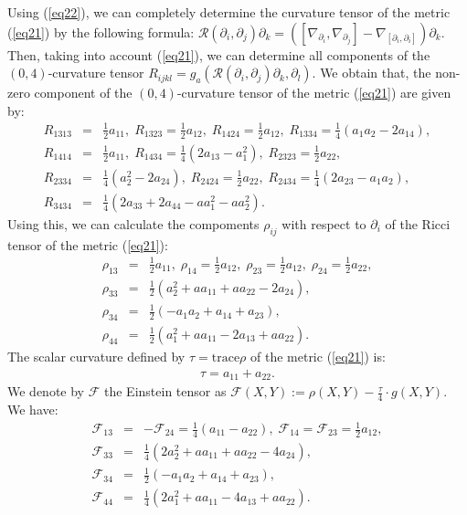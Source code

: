 \documentclass[reqno, 12pt]{amsart}
\numberwithin{equation}{section}
\begin{document}
Using (\ref{eq22}), we can completely determine the curvature tensor
of the metric (\ref{eq21}) by the following formula:
$\mathcal{R}(\partial_i, \partial_j)\partial_k = ([\nabla_{\partial_i}, 
\nabla_{\partial_j}]  - \nabla_{[\partial_i, \partial_i]}) \partial_k$. Then, 
taking into account (\ref{eq21}), we can determine all components 
of the $(0,4)$-curvature tensor 
$R_{ijkl}=g_{a}(\mathcal{R}(\partial_i,\partial_j)\partial_k, \partial_l)$. 
We obtain that, the non-zero component of the $(0,4)$-curvature tensor 
of the metric (\ref{eq21}) are given by:
\begin{eqnarray}\label{eq23}
R_{1313} &=& \frac{1}{2}a_{11}, \;
R_{1323} = \frac{1}{2}a_{12}, \;
R_{1424} = \frac{1}{2}a_{12} ,\;
R_{1334} = \frac{1}{4}(a_1a_2-2a_{14}) , \nonumber\\
R_{1414} & = & \frac{1}{2}a_{11} ,\;
R_{1434} = \frac{1}{4}(2a_{13} - a^{2}_1) ,\;
R_{2323} = \frac{1}{2}a_{22} , \nonumber\\
R_{2334} &=& \frac{1}{4}(a^{2}_2-2a_{24}) , \;
R_{2424} = \frac{1}{2}a_{22} ,\; 
R_{2434} = \frac{1}{4}(2a_{23} - a_1a_2) ,\nonumber\\
R_{3434} &=& \frac{1}{4}(2a_{33} + 2a_{44} - aa^{2}_1 - aa^{2}_2).
\end{eqnarray}
Using this, we can calculate the compoments $\rho_{ij}$ with respect 
to $\partial_i$ of the Ricci tensor of the metric (\ref{eq21}):  
\begin{eqnarray}\label{eq24}
\rho_{13} &=& \frac{1}{2}a_{11}, \;
\rho_{14} = \frac{1}{2}a_{12}, \;
\rho_{23} = \frac{1}{2}a_{12}, \;
\rho_{24} = \frac{1}{2}a_{22}, \nonumber\\
\rho_{33} &=& \frac{1}{2}(a^2_{2} + aa_{11} + aa_{22}
- 2a_{24}), \nonumber \\
\rho_{34} &=& \frac{1}{2}(-a_1a_2 + a_{14} + a_{23}),\nonumber\\
\rho_{44} &=& \frac{1}{2}(a^{2}_{1} + aa_{11} - 2a_{13} + aa_{22}).
\end{eqnarray}
The scalar curvature defined by $\tau = \mathrm{trace} \rho$ of the 
metric (\ref{eq21}) is:
\begin{eqnarray*}
\tau = a_{11} + a_{22}.
\end{eqnarray*}
We denote by $\mathcal{F}$ the Einstein tensor as 
$\mathcal{F}(X,Y) := \rho (X,Y) - \frac{\tau}{4} \cdot g(X,Y)$. We have:
\begin{eqnarray*}
\mathcal{F}_{13} &=& -\mathcal{F}_{24} =\frac{1}{4}(a_{11} - a_{22}),\;
\mathcal{F}_{14} = \mathcal{F}_{23} =\frac{1}{2}a_{12}, \\
\mathcal{F}_{33}&=& \frac{1}{4}(2a^{2}_{2} + aa_{11} + aa_{22} - 4a_{24}),\\
\mathcal{F}_{34} &=& \frac{1}{2}(- a_1a_2 + a_{14} + a_{23}),\\
\mathcal{F}_{44} &=& \frac{1}{4}(2a^{2}_{1} + aa_{11} - 4a_{13}
+ aa_{22}).
\end{eqnarray*}
\end{document}
